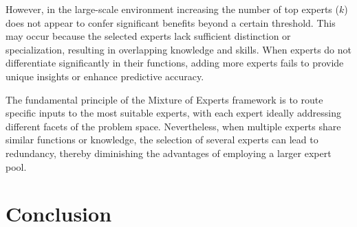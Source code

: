 \documentclass[preprint,12pt]{elsarticle}
\begin{document}
However, in the large-scale environment increasing the number of top experts ($k$) does not appear to confer significant benefits beyond a certain threshold. This may occur because the selected experts lack sufficient distinction or specialization, resulting in overlapping knowledge and skills. When experts do not differentiate significantly in their functions, adding more experts fails to provide unique insights or enhance predictive accuracy.

The fundamental principle of the Mixture of Experts framework is to route specific inputs to the most suitable experts, with each expert ideally addressing different facets of the problem space. Nevertheless, when multiple experts share similar functions or knowledge, the selection of several experts can lead to redundancy, thereby diminishing the advantages of employing a larger expert pool.

\section{Conclusion}
\end{document}
